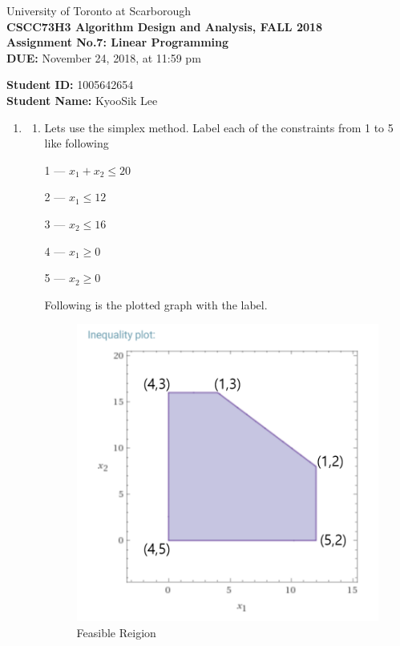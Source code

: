 \documentclass[a4paper,11pt]{article}
\begin{document}
\begin{center}
University of Toronto at Scarborough\\[0.1in]
{\bf CSCC73H3 Algorithm Design and Analysis, FALL 2018} \\[0.1in]
{\large{\bf Assignment No.7: Linear Programming }}\\[0.1in]
{\bf DUE:} November 24, 2018, at 11:59 pm
\end{center}


\vspace{0.1in}
\noindent
{\bf Student ID:} 1005642654 \\[0.15in]
{\bf Student Name:} KyooSik Lee
\vspace{0.3in}

\vspace{0.3in}
\begin{enumerate}

\item 

\begin{enumerate}
\item
Lets use the simplex method. Label each of the constraints from 1 to 5 like following

1 --- $x_1+x_2\leq 20$

2 --- $x_1\leq 12$

3 --- $x_2 \leq 16$

4 --- $x_1 \geq 0$

5 --- $x_2 \geq 0$

Following is the plotted graph with the label.
\begin{figure}[hbt]
	\centering
	\includegraphics[scale=0.4]{figure1.png}
	\caption{Feasible Reigion}
\end{figure}


\end{enumerate}
\end{enumerate}
\end{document}
